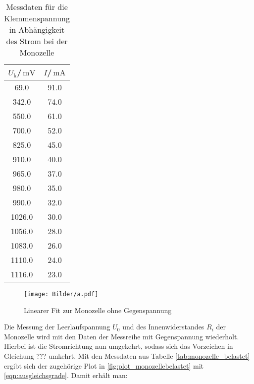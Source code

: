 \begin{table}
  \centering
  \caption{Messdaten für die Klemmenspannung in Abhängigkeit des Strom bei der Monozelle}
  \label{tab:mono}

\begin{tabular}{cc}
  \toprule
$U_\text{k}$/$\,\si{\milli\volt}$ & $I$/$\,\si{\milli\ampere}$\\
\midrule
69.0 & 91.0 \\
342.0 & 74.0 \\
550.0 & 61.0 \\
700.0 & 52.0 \\
825.0 & 45.0 \\
910.0 & 40.0 \\
965.0 & 37.0 \\
980.0 & 35.0 \\
990.0 & 32.0 \\
1026.0 & 30.0 \\
1056.0 & 28.0 \\
1083.0 & 26.0 \\
1110.0 & 24.0 \\
1116.0 & 23.0 \\
\bottomrule
\end{tabular}
\end{table}
\begin{figure}
\texttt{[image: Bilder/a.pdf]}
\caption{Linearer Fit zur Monozelle ohne Gegenspannung}
\label{fig:plot_a}
\end{figure}


Die Messung der Leerlaufspannung $U_\text{0}$ und des Innenwiderstandes $R_i$ der Monozelle wird mit den Daten der Messreihe mit Gegenspannung wiederholt. Hierbei ist die Stromrichtung nun umgekehrt, sodass sich das Vorzeichen in Gleichung ??? umkehrt.
Mit den Messdaten aus Tabelle \ref{tab:monozelle_belastet} ergibt sich der zugehörige Plot in \ref{fig:plot_monozellebelastet} mit \eqref{eqn:ausgleichsgrade}. Damit erhält man:

